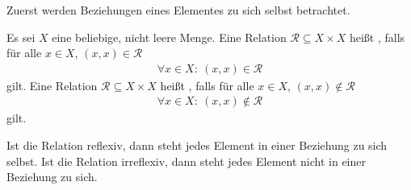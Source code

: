 \begin{Unit}
Zuerst werden Beziehungen eines Elementes zu sich selbst betrachtet.
\begin{Definition}
  Es sei $X$ eine beliebige, nicht leere Menge. Eine Relation $\mathcal{R} 
  \subseteq X \times X$ heißt , falls für alle $x \in 
  X$, $(x, x) \in \mathcal{R}$
  \begin{align}
    \forall x \in X:\ (x, x) \in \mathcal{R}
  \end{align}
  gilt. Eine Relation $\mathcal{R} \subseteq X \times X$ heißt 
  , falls für alle $x \in X$, $(x, x) \notin 
  \mathcal{R}$
  \begin{align}
    \forall x \in X:\ (x, x) \notin \mathcal{R}
  \end{align}
  gilt. 
\end{Definition}

Ist die Relation reflexiv, dann steht jedes Element in einer Beziehung zu sich
selbst. Ist die Relation irreflexiv, dann steht jedes Element nicht in einer
Beziehung zu sich.
\end{Unit}

